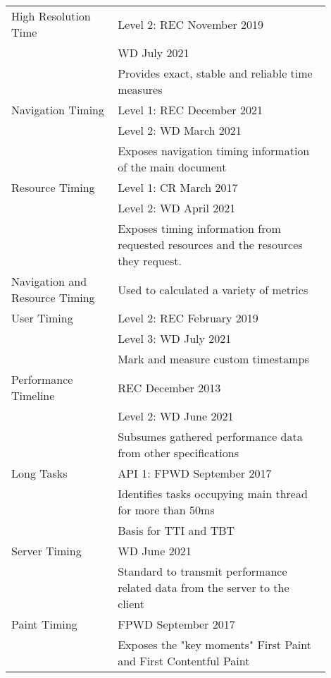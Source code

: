 

\begin{center}
\small
	\begin{tabular}{ p{0.3\linewidth} | p{0.6\linewidth} }
	High Resolution Time
	& Level 2: REC November 2019 \\
	& WD July 2021 \\
	& Provides exact, stable and reliable time measures \\
	\hline
	Navigation Timing
	& Level 1: REC December 2021 \\
	& Level 2: WD March 2021 \\
	& Exposes navigation timing information of the main document \\
	\hline
	Resource Timing
	& Level 1: CR March 2017 \\
	& Level 2: WD April 2021 \\
	& Exposes timing information from requested resources and the resources they request.  \\
	\hline
	Navigation and Resource Timing
	& Used to calculated a variety of metrics \\
	\hline
	\hline
	User Timing
	& Level 2: REC February 2019 \\
	& Level 3: WD July 2021 \\
	& Mark and measure custom timestamps \\
	\hline
	Performance Timeline
	& REC December 2013 \\
	& Level 2: WD June 2021 \\
	& Subsumes gathered performance data from other specifications \\
	\hline
	Long Tasks
	& API 1: FPWD  September 2017 \\
	& Identifies tasks occupying main thread for more than 50ms \\
	& Basis for TTI and TBT \\
	\hline
	Server Timing
	& WD June 2021 \\
	& Standard to transmit performance related data from the server to the client \\
	\hline
	Paint Timing
	& FPWD September 2017 \\
	& Exposes the "key moments" First Paint and First Contentful Paint \\
	\end{tabular}
\end{center}



